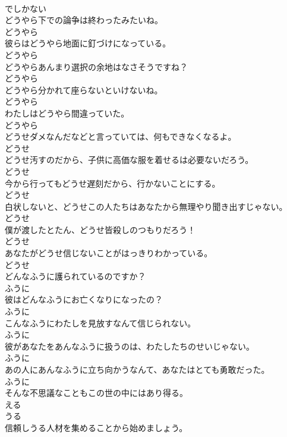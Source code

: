 \documentclass[8pt]{extreport}
\begin{document}
\begin{CJK}{UTF8}{min}
\\	でしかない
\\	どうやら下での論争は終わったみたいね。	
\\	どうやら
\\	彼らはどうやら地面に釘づけになっている。	
\\	どうやら
\\	どうやらあんまり選択の余地はなさそうですね？	
\\	どうやら
\\	どうやら分かれて座らないといけないね。	
\\	どうやら
\\	わたしはどうやら間違っていた。	
\\	どうやら
\\	どうせダメなんだなどと言っていては、何もできなくなるよ。	
\\	どうせ
\\	どうせ汚すのだから、子供に高価な服を着せるは必要ないだろう。	
\\	どうせ
\\	今から行ってもどうせ遅刻だから、行かないことにする。	
\\	どうせ
\\	白状しないと、どうせこの人たちはあなたから無理やり聞き出すじゃない。	
\\	どうせ
\\	僕が渡したとたん、どうせ皆殺しのつもりだろう！	
\\	どうせ
\\	あなたがどうせ信じないことがはっきりわかっている。	
\\	どうせ
\\	どんなふうに護られているのですか？	
\\	ふうに
\\	彼はどんなふうにお亡くなりになったの？	
\\	ふうに
\\	こんなふうにわたしを見放すなんて信じられない。	
\\	ふうに
\\	彼があなたをあんなふうに扱うのは、わたしたちのせいじゃない。	
\\	ふうに
\\	あの人にあんなふうに立ち向かうなんて、あなたはとても勇敢だった。	
\\	ふうに
\\	そんな不思議なこともこの世の中にはあり得る。	
\\	える 
\\	うる
\\	信頼しうる人材を集めることから始めましょう。	

\end{CJK}
\end{document}
